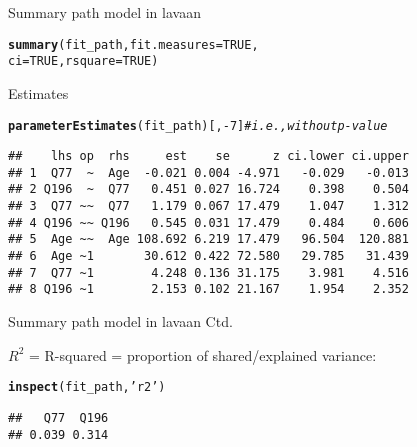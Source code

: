 \documentclass[10pt]{beamer}\usepackage[]{graphicx}\usepackage[]{xcolor}
\makeatletter
\newcommand{\hlnum}[1]{\textcolor[rgb]{0.686,0.059,0.569}{#1}}%
\newcommand{\hlstr}[1]{\textcolor[rgb]{0.192,0.494,0.8}{#1}}%
\newcommand{\hlcom}[1]{\textcolor[rgb]{0.678,0.584,0.686}{\textit{#1}}}%
\newcommand{\hlopt}[1]{\textcolor[rgb]{0,0,0}{#1}}%
\newcommand{\hlstd}[1]{\textcolor[rgb]{0.345,0.345,0.345}{#1}}%
\newcommand{\hlkwc}[1]{\textcolor[rgb]{0.333,0.667,0.333}{#1}}%
\newcommand{\hlkwd}[1]{\textcolor[rgb]{0.737,0.353,0.396}{\textbf{#1}}}%
\newenvironment{kframe}{%
 \def\at@end@of@kframe{}%
 \ifinner\ifhmode%
  \def\at@end@of@kframe{\end{minipage}}%
  \begin{minipage}{\columnwidth}%
 \fi\fi%
 \def\FrameCommand##1{\hskip\@totalleftmargin \hskip-\fboxsep
 \colorbox{shadecolor}{##1}\hskip-\fboxsep
     \hskip-\linewidth \hskip-\@totalleftmargin \hskip\columnwidth}%
 \MakeFramed {\advance\hsize-\width
   \@totalleftmargin\z@ \linewidth\hsize
   \@setminipage}}%
 {\par\unskip\endMakeFramed%
 \at@end@of@kframe}
\newenvironment{knitrout}{}{} %
\makeatother
\begin{document}
\begin{frame}[fragile]{Summary path model in lavaan}

\begin{knitrout}
\color{fgcolor}\begin{kframe}
\begin{alltt}
\hlkwd{summary}\hlstd{(fit_path,} \hlkwc{fit.measures} \hlstd{=} \hlnum{TRUE}\hlstd{,}
        \hlkwc{ci} \hlstd{=} \hlnum{TRUE}\hlstd{,} \hlkwc{rsquare} \hlstd{=} \hlnum{TRUE}\hlstd{)}
\end{alltt}
\end{kframe}
\end{knitrout}

Estimates 
\begin{knitrout}
\color{fgcolor}\begin{kframe}
\begin{alltt}
\hlkwd{parameterEstimates}\hlstd{(fit_path)[,}\hlopt{-}\hlnum{7}\hlstd{]} \hlcom{# i.e., without p-value}
\end{alltt}
\begin{verbatim}
##    lhs op  rhs     est    se      z ci.lower ci.upper
## 1  Q77  ~  Age  -0.021 0.004 -4.971   -0.029   -0.013
## 2 Q196  ~  Q77   0.451 0.027 16.724    0.398    0.504
## 3  Q77 ~~  Q77   1.179 0.067 17.479    1.047    1.312
## 4 Q196 ~~ Q196   0.545 0.031 17.479    0.484    0.606
## 5  Age ~~  Age 108.692 6.219 17.479   96.504  120.881
## 6  Age ~1       30.612 0.422 72.580   29.785   31.439
## 7  Q77 ~1        4.248 0.136 31.175    3.981    4.516
## 8 Q196 ~1        2.153 0.102 21.167    1.954    2.352
\end{verbatim}
\end{kframe}
\end{knitrout}

\end{frame}
%
\begin{frame}[fragile]{Summary path model in lavaan Ctd.}

$R^2$ = R-squared = proportion of shared/explained variance:
\begin{knitrout}
\color{fgcolor}\begin{kframe}
\begin{alltt}
\hlkwd{inspect}\hlstd{(fit_path,} \hlstr{'r2'}\hlstd{)}
\end{alltt}
\begin{verbatim}
##   Q77  Q196 
## 0.039 0.314
\end{verbatim}
\end{kframe}
\end{knitrout}

%

\end{frame}
\end{document}
